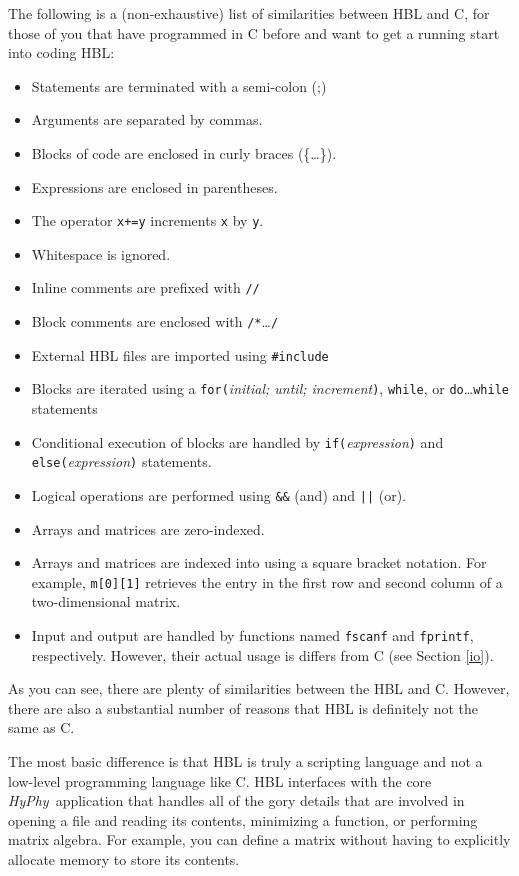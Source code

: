 \documentclass[12pt,twoside,openright]{book}
\newcommand{\hyphy}{\textit{HyPhy}}
\begin{document}
The following is a (non-exhaustive) list of similarities between HBL and C, for those of you that have programmed in C before and want to get a running start into coding HBL:

\begin{itemize}
\itemsep 2pt
\item Statements are terminated with a semi-colon (;) 
\item Arguments are separated by commas.
\item Blocks of code are enclosed in curly braces (\{\ldots\}). 
\item Expressions are enclosed in parentheses.
\item The operator {\tt x+=y} increments {\tt x} by {\tt y}.
\item Whitespace is ignored.
\item Inline comments are prefixed with {\tt //}
\item Block comments are enclosed with {\tt /*}\ldots{\tt */}
\item External HBL files are imported using {\tt \#include}
\item Blocks are iterated using a {\tt for(}{\it initial; until; increment}{\tt )}, {\tt while}, or {\tt do}\ldots{\tt while} statements
\item Conditional execution of blocks are handled by {\tt if(}{\it expression}{\tt )} and {\tt else(}{\it expression}{\tt )} statements.
\item Logical operations are performed using {\tt \&\&} (and) and {\tt ||} (or).
\item Arrays and matrices are zero-indexed.
\item Arrays and matrices are indexed into using a square bracket notation.  For example, {\tt m[0][1]} retrieves the entry in the first row and second column of a two-dimensional matrix.
\item Input and output are handled by functions named {\tt fscanf} and {\tt fprintf}, respectively.  However, their actual usage is differs from C (see Section \ref{io}).
\end{itemize}

\noindent As you can see, there are plenty of similarities between the HBL and C.  However, there are also a substantial number of reasons that HBL is definitely not the same as C.  

The most basic difference is that HBL is truly a scripting language and not a low-level programming language like C.  HBL interfaces with the core \hyphy\ application that handles all of the gory details that are involved in opening a file and reading its contents, minimizing a function, or performing matrix algebra.  For example, you can define a matrix without having to explicitly allocate memory to store its contents.
\end{document}
